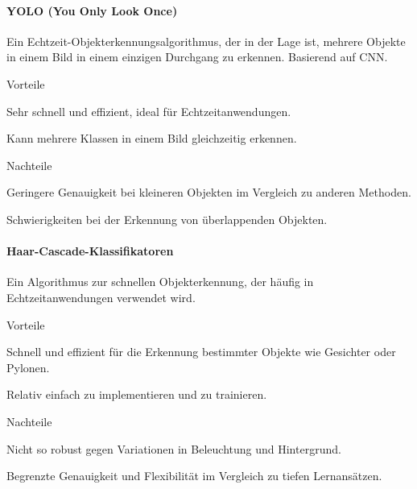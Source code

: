 \paragraph{YOLO (You Only Look Once)}

Ein Echtzeit-Objekterkennungsalgorithmus, der in der Lage ist, mehrere Objekte in einem Bild in einem einzigen Durchgang zu erkennen. Basierend auf CNN.

\begin{minipage}[t]{0.48\textwidth}
\begin{items}
  \item [Vorteile]
  \item Sehr schnell und effizient, ideal für Echtzeitanwendungen.
  \item Kann mehrere Klassen in einem Bild gleichzeitig erkennen.
\end{items}
\end{minipage}
\hfill
\begin{minipage}[t]{0.48\textwidth}
\begin{items}
  \item [Nachteile]
  \item Geringere Genauigkeit bei kleineren Objekten im Vergleich zu anderen Methoden.
  \item Schwierigkeiten bei der Erkennung von überlappenden Objekten.
\end{items}
\end{minipage}

\paragraph{Haar-Cascade-Klassifikatoren}

Ein Algorithmus zur schnellen Objekterkennung, der häufig in Echtzeitanwendungen verwendet wird.

\begin{minipage}[t]{0.48\textwidth}
\begin{items}
  \item [Vorteile]
  \item Schnell und effizient für die Erkennung bestimmter Objekte wie Gesichter oder Pylonen.
  \item Relativ einfach zu implementieren und zu trainieren.
\end{items}
\end{minipage}
\hfill
\begin{minipage}[t]{0.48\textwidth}
\begin{items}
  \item [Nachteile]
  \item Nicht so robust gegen Variationen in Beleuchtung und Hintergrund.
  \item Begrenzte Genauigkeit und Flexibilität im Vergleich zu tiefen Lernansätzen.
\end{items}
\end{minipage}

